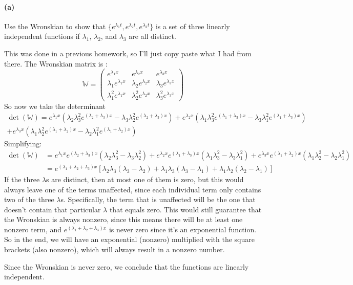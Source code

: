 \documentclass{article}
\begin{document}
\paragraph{(a)}
Use the Wronskian to show that $\{e^{\lambda_{1}t},e^{\lambda_{2}t},e^{\lambda_{3}t}\}$ is a set of three linearly independent functions if $\lambda_{1}$, $\lambda_{2}$,
and $\lambda_{3}$ are all distinct.

\begin{solution}
	This was done in a previous homework, so I'll just copy paste what I had from there. The Wronskian matrix is
:
	\[
		\mathbb W = \begin{pmatrix} e^{\lambda_1 x} & e^{\lambda_2x} & e^{\lambda_3x}\\
		\lambda_1 e^{\lambda_1x} & \lambda_2e^{\lambda_2x} & \lambda_3e^{\lambda_3x}\\
	\lambda_1^2 e^{\lambda_1x} & \lambda_2^2 e^{\lambda_2x} & \lambda_3^2e^{\lambda_3x}\end{pmatrix}
	\]
	So now we take the determinant
	\begin{multline*}
		\det(\mathbb W) = e^{\lambda_1x}\left( \lambda_2\lambda_3^2 e^{(\lambda_2 + \lambda_3)x} - \lambda_3\lambda_2^2
			e^{(\lambda_2 + \lambda_3)x}\right) +
			e^{\lambda_2x} \left( \lambda_1 \lambda_3^2 e^{(\lambda_1 + \lambda_3)x} - \lambda_3\lambda_1^2
		e^{(\lambda_1 + \lambda_3)x}\right) \\
		+ e^{\lambda_3 x}\left(\lambda_1\lambda_2^2 e^{(\lambda_1 + \lambda_2)x} -
			\lambda_2\lambda_1^2 e^{(\lambda_1 + \lambda_2)x}\right)
	\end{multline*}
	Simplifying:
	\begin{align*}
		\det(\mathbb W) &= e^{\lambda_1x}e^{(\lambda_2 +\lambda_3)x}\left( \lambda_2\lambda_3^2 -
		\lambda_3\lambda_2^2\right) + e^{\lambda_2x} e^{(\lambda_1 + \lambda_3)x} \left( \lambda_1\lambda_3^2 -
		\lambda_3\lambda_1^2\right) + e^{\lambda_3x}e^{(\lambda_1 + \lambda_2)x}\left( \lambda_1 \lambda_2^2 -
			\lambda_2 \lambda_1^2\right)\\
		&= e^{(\lambda_1 + \lambda_2 + \lambda_3)x} \left[ \lambda_2\lambda_3(\lambda_3 - \lambda_2) +
		\lambda_1 \lambda_3(\lambda_3 - \lambda_1) + \lambda_1 \lambda_2(\lambda_2 - \lambda_1)\right]
	\end{align*}
	If the three $\lambda$s are distinct, then at most one of them is zero, but this would always leave
	one of the terms unaffected, since each individual term only contains two of the three $\lambda$s.
	Specifically, the term that is unaffected will be the one that doesn't contain that particular $\lambda$
	that equals zero. This would still guarantee that the Wronskian is always nonzero, since this means
	there will be at least one nonzero term, and $e^{(\lambda_1 + \lambda_2 + \lambda_3)x}$ is never zero
	since it's an exponential function. So in the end, we will have an exponential (nonzero) multiplied with
	the square brackets (also nonzero), which will always result in a nonzero number.

	Since the Wronskian is never zero, we conclude that the functions are linearly independent.
\end{solution}
\end{document}
